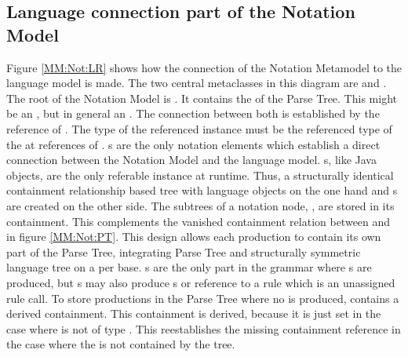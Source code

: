 \subsection{Language connection part of the Notation Model} \label{sec:MM:Not:Prod}
Figure \ref{MM:Not:LR} shows how the connection of the Notation Metamodel to the language model is made. The two central metaclasses in this diagram are  and . The root of the Notation Model is . It contains the  of the Parse Tree. This might be an , but in general an . The connection between both is established by the reference  of .  The type of the referenced instance must be the referenced type of the  at  references of . s are the only notation elements which establish a direct connection between the Notation Model and the language model. s, like Java objects, are the only referable instance at runtime. Thus, a structurally identical containment relationship based tree with language objects on the one hand and s are created on the other side. The subtrees of a notation node, , are stored in its  containment. This complements the vanished containment relation between  and  in figure \ref{MM:Not:PT}. This design allows each  production to contain its own part of the Parse Tree, integrating Parse Tree and structurally symmetric language tree on a per  base. s are the only part in the grammar where s are produced, but s may also produce s or reference to a rule which is an unassigned rule call. To store productions in the Parse Tree where no  is produced,  contains a derived  containment. This containment is derived, because it is just set in the case where  is not of type . This reestablishes the missing containment reference in the case where the  is not contained by the  tree. \\
